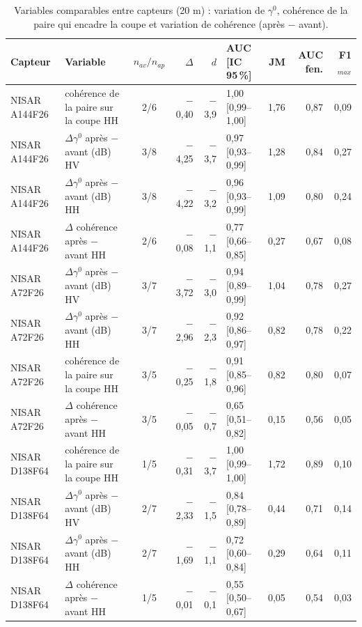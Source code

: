 \begin{table}[htbp]
\centering
\scriptsize
\caption{Variables comparables entre capteurs (20 m) : variation de $\gamma^0$, cohérence de la paire qui encadre la coupe et variation de cohérence (après $-$ avant).}
\label{tab-core}
\begin{tabular}{llcrrlrrr}
\toprule
Capteur & Variable & $n_{av}/n_{ap}$ & $\Delta$ & $d$ & AUC [IC 95\,\%] & JM & AUC fen. & F1$_{max}$ \\
\midrule
NISAR A144F26 & cohérence de la paire sur la coupe HH & 2/6 & $-$0{,}40 & $-$3{,}9 & 1{,}00 [0{,}99--1{,}00] & 1{,}76 & 0{,}87 & 0{,}09 \\
NISAR A144F26 & $\Delta\gamma^0$ après $-$ avant (dB) HV & 3/8 & $-$4{,}25 & $-$3{,}7 & 0{,}97 [0{,}93--0{,}99] & 1{,}28 & 0{,}84 & 0{,}27 \\
NISAR A144F26 & $\Delta\gamma^0$ après $-$ avant (dB) HH & 3/8 & $-$4{,}22 & $-$3{,}2 & 0{,}96 [0{,}93--0{,}99] & 1{,}09 & 0{,}80 & 0{,}24 \\
NISAR A144F26 & $\Delta$ cohérence après $-$ avant HH & 2/6 & $-$0{,}08 & $-$1{,}1 & 0{,}77 [0{,}66--0{,}85] & 0{,}27 & 0{,}67 & 0{,}08 \\
\addlinespace
NISAR A72F26 & $\Delta\gamma^0$ après $-$ avant (dB) HV & 3/7 & $-$3{,}72 & $-$3{,}0 & 0{,}94 [0{,}89--0{,}99] & 1{,}04 & 0{,}78 & 0{,}27 \\
NISAR A72F26 & $\Delta\gamma^0$ après $-$ avant (dB) HH & 3/7 & $-$2{,}96 & $-$2{,}3 & 0{,}92 [0{,}86--0{,}97] & 0{,}82 & 0{,}78 & 0{,}22 \\
NISAR A72F26 & cohérence de la paire sur la coupe HH & 3/5 & $-$0{,}25 & $-$1{,}8 & 0{,}91 [0{,}85--0{,}96] & 0{,}82 & 0{,}80 & 0{,}07 \\
NISAR A72F26 & $\Delta$ cohérence après $-$ avant HH & 3/5 & $-$0{,}05 & $-$0{,}7 & 0{,}65 [0{,}51--0{,}82] & 0{,}15 & 0{,}56 & 0{,}05 \\
\addlinespace
NISAR D138F64 & cohérence de la paire sur la coupe HH & 1/5 & $-$0{,}31 & $-$3{,}7 & 1{,}00 [0{,}99--1{,}00] & 1{,}72 & 0{,}89 & 0{,}10 \\
NISAR D138F64 & $\Delta\gamma^0$ après $-$ avant (dB) HV & 2/7 & $-$2{,}33 & $-$1{,}5 & 0{,}84 [0{,}78--0{,}89] & 0{,}44 & 0{,}71 & 0{,}14 \\
NISAR D138F64 & $\Delta\gamma^0$ après $-$ avant (dB) HH & 2/7 & $-$1{,}69 & $-$1{,}1 & 0{,}72 [0{,}60--0{,}84] & 0{,}29 & 0{,}64 & 0{,}11 \\
NISAR D138F64 & $\Delta$ cohérence après $-$ avant HH & 1/5 & $-$0{,}01 & $-$0{,}1 & 0{,}55 [0{,}50--0{,}67] & 0{,}05 & 0{,}54 & 0{,}03 \\

\end{tabular}
\end{table}
